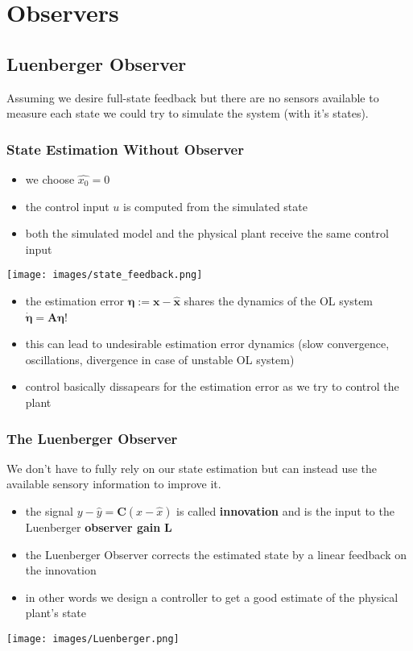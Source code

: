 \section{Observers}
\subsection{Luenberger Observer}
Assuming we desire full-state feedback but there are no sensors available to measure each state we could try to simulate the system (with it's states).
\subsubsection{State Estimation Without Observer}
\begin{itemize}
    \item we choose $\hat{x_0}=0$
    \item the control input $u$ is computed from the simulated state
    \item both the simulated model and the physical plant receive the same control input
\end{itemize}
\begin{center}
    \texttt{[image: images/state\_feedback.png]}\\
\end{center}

\begin{itemize}
    \item the estimation error $\mathbf{\eta}:=\mathbf{x}-\mathbf{\hat{x}}$ shares the dynamics of the OL system $\mathbf{\dot{\eta}}=\mathbf{A\eta}$!
    \item this can lead to undesirable estimation error dynamics (slow convergence, oscillations, divergence in case of unstable OL system)
    \item control basically dissapears for the estimation error as we try to control the plant
\end{itemize}

\subsubsection{The Luenberger Observer}
We don't have to fully rely on our state estimation but can instead use the available sensory information to improve it.
\begin{itemize}
    \item the signal $y-\hat{y}=\mathbf{C}(x-\hat{x})$ is called \textbf{innovation} and is the input to the Luenberger \textbf{observer gain} $\mathbf{L}$
    \item the Luenberger Observer corrects the estimated state by a linear feedback on the innovation
    \item in other words we design a controller to get a good estimate of the physical plant's state
\end{itemize}
\begin{center}
    \texttt{[image: images/Luenberger.png]}
\end{center}

